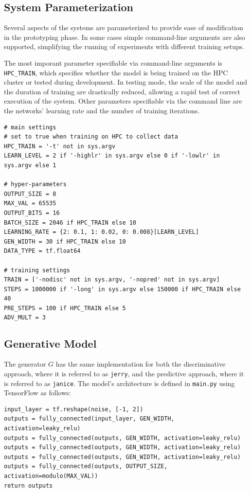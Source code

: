 \documentclass[12pt, titlepage]{report}
\theoremstyle{definition}
\begin{document}
\subsection{System Parameterization}
Several aspects of the systems are parameterized to provide ease of modification in the prototyping phase. In some cases simple command-line arguments are also supported, simplifying the running of experiments with different training setups. 

The most imporant parameter specifiable via command-line arguments is \texttt{HPC_TRAIN}, which specifies whether the model is being trained on the HPC cluster or tested during development. In testing mode, the scale of the model and the duration of training are drastically reduced, allowing a rapid test of correct execution of the system. Other parameters specifiable via the command line are the networks' learning rate and the number of training iterations.

\begin{verbatim}
# main settings
# set to true when training on HPC to collect data
HPC_TRAIN = '-t' not in sys.argv
LEARN_LEVEL = 2 if '-highlr' in sys.argv else 0 if '-lowlr' in sys.argv else 1

# hyper-parameters
OUTPUT_SIZE = 8
MAX_VAL = 65535
OUTPUT_BITS = 16
BATCH_SIZE = 2046 if HPC_TRAIN else 10
LEARNING_RATE = {2: 0.1, 1: 0.02, 0: 0.008}[LEARN_LEVEL]
GEN_WIDTH = 30 if HPC_TRAIN else 10
DATA_TYPE = tf.float64

# training settings
TRAIN = ['-nodisc' not in sys.argv, '-nopred' not in sys.argv]
STEPS = 1000000 if '-long' in sys.argv else 150000 if HPC_TRAIN else 40
PRE_STEPS = 100 if HPC_TRAIN else 5
ADV_MULT = 3
\end{verbatim}


\subsection{Generative Model}
The generator $G$ has the same implementation for both the discriminative approach, where it is referred to as \texttt{jerry}, and the predictive approach, where it is referred to as \texttt{janice}. The model's architecture is defined in \texttt{main.py} using TensorFlow as follows:

\begin{verbatim}
input_layer = tf.reshape(noise, [-1, 2])
outputs = fully_connected(input_layer, GEN_WIDTH, activation=leaky_relu)
outputs = fully_connected(outputs, GEN_WIDTH, activation=leaky_relu)
outputs = fully_connected(outputs, GEN_WIDTH, activation=leaky_relu)
outputs = fully_connected(outputs, GEN_WIDTH, activation=leaky_relu)
outputs = fully_connected(outputs, OUTPUT_SIZE, activation=modulo(MAX_VAL))
return outputs
\end{verbatim}
\end{document}
